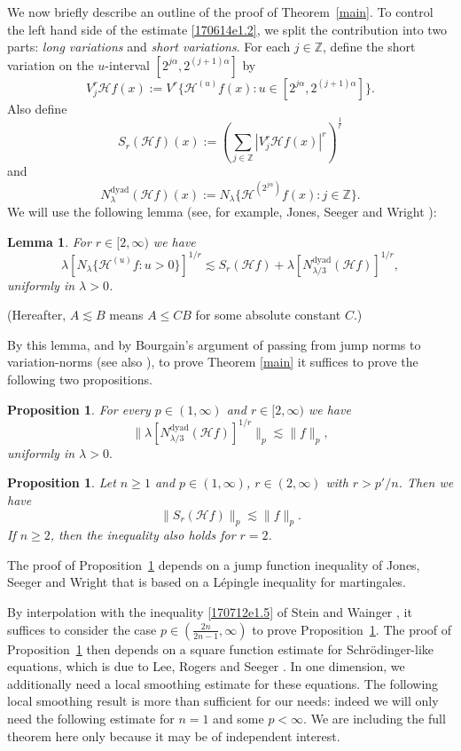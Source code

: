 \documentclass[12pt,leqno]{amsart}
\def\Z{\mathbb{Z}}
\theoremstyle{plain}
\newtheorem{prop}[thm]{Proposition}
\newtheorem{lem}[thm]{Lemma}
\numberwithin{equation}{section}
\begin{document}
We now briefly describe an outline of the proof of Theorem~\ref{main}. 
To control the left hand side of the estimate \eqref{170614e1.2}, we split the contribution into two parts: \emph{long variations} and \emph{short variations}. For each $j \in \Z$, define the short variation on the $u$-interval $[2^{j\alpha}, 2^{(j+1)\alpha}]$ by
\[
V^{r}_{ j}{\mathcal{H} f}(x)
:= V^{r} \{\mathcal{H}^{(u)} f (x) \colon u \in [2^{j\alpha}, 2^{(j+1)\alpha}]\}.
\]
Also define
\[
S_{r} (\mathcal{H}f)(x) :=\left(\sum_{j\in \Z} |V_j^{r} \mathcal{H}f (x)|^{r} \right)^{\frac{1}{r}}
\]
and
\[
N^{\mathrm{dyad}}_{\lambda}(\mathcal{H}f)(x) :=N_{\lambda}\{\mathcal{H}^{(2^{j \alpha})}f(x): j\in \Z\}.
\]
We will use the following lemma (see, for example, Jones, Seeger and Wright \cite{MR2434308}):
\begin{lem}
For $r\in[2,\infty)$ we have 
\[
\lambda [N_{\lambda} \{\mathcal{H}^{(u)} f \colon u > 0\}]^{1/r} \lesssim S_{r}(\mathcal{H}f)+\lambda [N_{\lambda/3}^{\mathrm{dyad}}(\mathcal{H}f)]^{1/r},
\]
uniformly in $\lambda > 0$.
\end{lem}
(Hereafter, $A \lesssim B$ means $A \leq C B$ for some absolute constant $C$.) 

By this lemma, and by Bourgain's argument \cite{MR1019960} of passing from jump norms to variation-norms (see also \cite[Section 2]{MR2434308}), to prove Theorem \ref{main} it suffices to prove the following two propositions. 
\begin{prop}\label{main1}
For every $p\in (1,\infty)$  and $r\in [2,\infty)$ we have 
\[
\|\lambda [N_{\lambda/3}^{\mathrm{dyad}}(\mathcal{H}f)]^{1/r}\|_p \lesssim \|f\|_p,
\]
uniformly in $\lambda > 0.$
\end{prop}

\begin{prop}\label{main2}
Let $n \ge 1$ and $p\in(1, \infty)$, $r\in (2,\infty)$ with $r>p'/n$. Then we have
\[
\|S_{r}(\mathcal{H} f)\|_p \lesssim \|f\|_p.
\]
If $n\ge 2$, then the inequality also holds for $r=2$.
\end{prop}

The proof of Proposition~\ref{main1} depends on a jump function inequality of Jones, Seeger and Wright \cite{MR2434308} that is based on a L\'epingle inequality for martingales. 

By interpolation with the inequality \eqref{170712e1.5} of Stein and Wainger \cite{MR1879821}, it suffices to consider the case $p\in(\frac{2n}{2n-1},\infty)$ to prove Proposition~\ref{main2}. The proof of Proposition~\ref{main2} then depends on a square function estimate for Schr\"odinger-like equations, which is due to Lee, Rogers and Seeger \cite{MR2946085}. In one dimension, we additionally need a local smoothing estimate for these equations. 
The following local smoothing result is more than sufficient for our needs: indeed we will only need the following estimate for $n = 1$ and some $p < \infty$. We are including the full theorem here only because it may be of independent interest.
\end{document}
